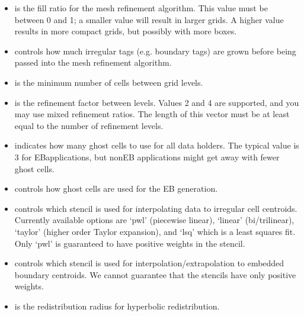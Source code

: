 \documentclass[letterpaper,10pt,english]{sphinxmanual}
\begin{document}
\begin{itemize}
\item {} 
 is the fill ratio for the mesh refinement algorithm. This value must be between 0 and 1; a smaller value will result in larger grids. A higher value results in more compact grids, but possibly with more boxes.

\item {} 
 controls how much irregular tags (e.g. boundary tags) are grown before being passed into the mesh refinement algorithm.

\item {} 
 is the minimum number of cells between grid levels.

\item {} 
 is the refinement factor between levels. Values 2 and 4 are supported, and you may use mixed refinement ratios. The length of this vector must be at least equal to the number of refinement levels.

\item {} 
 indicates how many ghost cells to use for all data holders. The typical value is 3 for EB\sphinxhyphen{}applications, but non\sphinxhyphen{}EB applications might get away with fewer ghost cells.

\item {} 
 controls how ghost cells are used for the EB generation.

\item {} 
 controls which stencil is used for interpolating data to irregular cell centroids. Currently available options are ‘pwl’ (piecewise linear), ‘linear’ (bi/trilinear), ‘taylor’ (higher order Taylor expansion), and ‘lsq’ which is a least squares fit. Only ‘pwl’ is guaranteed to have positive weights in the stencil.

\item {} 
 controls which stencil is used for interpolation/extrapolation to embedded boundary centroids. We cannot guarantee that the stencils have only positive weights.

\item {} 
 is the redistribution radius for hyperbolic redistribution.


\end{itemize}
\end{document}
